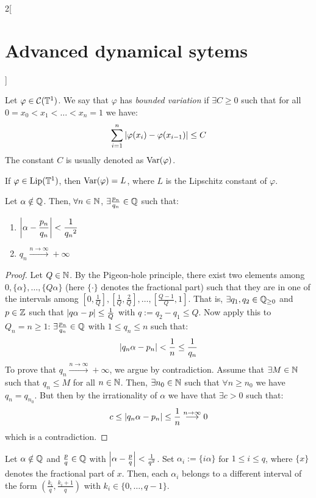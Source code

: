 \documentclass[../../../main_math.tex]{subfiles}
\begin{document}
\begin{multicols}{2}[\section{Advanced dynamical sytems}]
\begin{definition}
    Let $\varphi\in\mathcal{C}(\mathbb{T}^1)$. We say that $\varphi$ has \emph{bounded variation} if $\exists C\geq 0$ such that for all $0=x_0<x_1<\dots<x_n=1$ we have:
    $$
      \sum_{i=1}^n\abs{\varphi(x_i)-\varphi(x_{i-1})}\leq C
    $$
    The constant $C$ is usually denoted as $\mathrm{Var}(\varphi)$.
  \end{definition}
  \begin{remark}
    If $\varphi\in\text{Lip}(\mathbb{T}^1)$, then $\mathrm{Var}(\varphi)=L$, where $L$ is the Lipschitz constant of $\varphi$.
  \end{remark}
  \begin{lemma}\label{ADS:lema_pnqn}
    Let $\alpha\notin\mathbb{Q}$. Then, $\forall n\in\mathbb{N}$, $\exists \frac{p_n}{q_n}\in\mathbb{Q}$ such that:
    \begin{enumerate}
      \item $\displaystyle\abs{\alpha-\frac{p_n}{q_n}}<\frac{1}{{q_n}^2}$
      \item $q_n\overset{n\to\infty}{\longrightarrow}+\infty$
    \end{enumerate}
  \end{lemma}
  \begin{proof}
    Let $Q\in\mathbb{N}$. By the Pigeon-hole principle, there exist two elements among $0,\{\alpha\},\ldots,\{Q \alpha\}$ (here $\{\cdot\}$ denotes the fractional part) such that they are in one of the intervals among $\left[0,\frac{1}{Q}\right], \left[\frac{1}{Q},\frac{2}{Q}\right],\ldots,\left[\frac{Q-1}{Q},1\right]$. That is, $\exists q_1,q_2\in\mathbb{Q}_{\geq 0}$ and $p\in\mathbb{Z}$ such that $\abs{q\alpha -p}\leq \frac{1}{Q}$ with $q:=q_2-q_1\leq Q$. Now apply this to $Q_n=n\geq 1$: $\exists \frac{p_n}{q_n}\in \mathbb{Q}$ with $1\leq q_n\leq n$ such that:
    $$
      \abs{q_n\alpha-p_n}<\frac{1}{n}\leq \frac{1}{q_n}
    $$
    To prove that $q_n\overset{n\to\infty}{\longrightarrow}+\infty$, we argue by contradiction. Assume that $\exists M\in\mathbb{N}$ such that $q_n\leq M$ for all $n\in\mathbb{N}$. Then, $\exists n_0\in\mathbb{N}$ such that $\forall n\geq n_0$ we have $q_n=q_{n_0}$. But then by the irrationality of $\alpha$ we have that $\exists c>0$ such that:
    $$
      c\leq \abs{q_n\alpha-p_n}\leq \frac{1}{n} \overset{n\to\infty}{\longrightarrow} 0
    $$
    which is a contradiction.
  \end{proof}
  \begin{lemma}\label{ADS:lema_alpha_i}
    Let $\alpha\notin\mathbb{Q}$ and $\frac{p}{q}\in \mathbb{Q}$ with $\abs{\alpha-\frac{p}{q}}<\frac{1}{q^2}$. Set $\alpha_i:=\{i\alpha\}$ for $1\leq i\leq q$, where $\{x\}$ denotes the fractional part of $x$. Then, each $\alpha_i$ belongs to a different interval of the form $\left(\frac{k_i}{q},\frac{k_i+1}{q}\right)$ with $k_i\in\{0,\ldots,q-1\}$.

\end{lemma}
\end{multicols}
\end{document}
